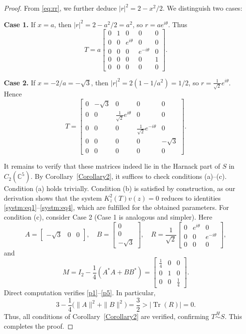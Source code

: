 \documentclass[12pt, reqno]{amsart}
\theoremstyle{definition}
\theoremstyle{remark}
\numberwithin{equation}{section}
\begin{document}
\begin{proof}
	From \eqref{eq:rr}, we further deduce $|r|^2 = 2 - x^2/2$. We distinguish two cases:
	
	\textbf{Case 1.} If $x = a$, then $|r|^2 = 2 - a^2/2 = a^2$, so $r = a e^{i\theta}$. Thus 
	\begin{equation}\label{T case1}
		T = a \begin{bmatrix}
			0 & 1 & 0 & 0 & 0\\
			0 & 0 & e^{i\theta} & 0 & 0\\
			0 & 0 & 0 & e^{-i\theta} & 0 \\
			0 & 0 & 0 & 0 & 1\\
			0 & 0 & 0 & 0 & 0
		\end{bmatrix}.
	\end{equation} 
	
	\textbf{Case 2.} If $x = -2/a = -\sqrt{3}$, then $|r|^2 = 2(1 - 1/a^2) = 1/2$, so $r = \frac{1}{\sqrt{2}} e^{i\theta}$. Hence
	\begin{equation}\label{T case2}
		T = \begin{bmatrix}
			0 & -\sqrt{3} & 0 & 0 & 0\\
			0 & 0 & \frac{1}{\sqrt{2}} e^{i\theta} & 0 & 0\\
			0 & 0 & 0 & \frac{1}{\sqrt{2}} e^{-i\theta} & 0 \\
			0 & 0 & 0 & 0 & -\sqrt{3} \\
			0 & 0 & 0 & 0 & 0
		\end{bmatrix}.
	\end{equation} 
	
	It remains to verify that these matrices indeed lie in the Harnack part of $S$ in $C_2(\mathbb{C}^5)$. By Corollary~\ref{Corollary2}, it suffices to check conditions (a)--(c). Condition (a) holds trivially. Condition (b) is satisfied by construction, as our derivation shows that the system $K_z^2(T)v(z)=0$ reduces to identities \eqref{systm:eq1}--\eqref{systm:eq4}, which are fulfilled for the obtained parameters. For condition (c), consider Case 2 (Case 1 is analogous and simpler). Here
	\[
	A = \begin{bmatrix} -\sqrt{3} & 0 & 0 \end{bmatrix}, \quad
	B = \begin{bmatrix} 0 \\ 0 \\ -\sqrt{3} \end{bmatrix}, \quad
	R = \frac{1}{\sqrt{2}} \begin{bmatrix}
		0 & e^{i\theta} & 0 \\ 
		0 & 0 & e^{-i\theta} \\
		0 & 0 & 0
	\end{bmatrix},
	\] 
	and 
	\[
	M = I_2 - \frac{1}{4}(A^*A + BB^*) = \begin{bmatrix}
		\frac{1}{4} & 0 & 0 \\ 
		0 & 1 & 0 \\
		0 & 0 & \frac{1}{4}
	\end{bmatrix}.
	\] 
	Direct computation verifies \eqref{p1}--\eqref{p5}. In particular,
	\[
	3 - \frac{1}{4}\bigl( \| A \|^2 + \| B \|^2 \bigr) = \frac{3}{2} > | \operatorname{Tr}(R) | = 0.
	\]
	Thus, all conditions of Corollary~\ref{Corollary2} are verified, confirming $T \stackrel{H}{\sim} S$. This completes the proof.
\end{proof}
\end{document}
